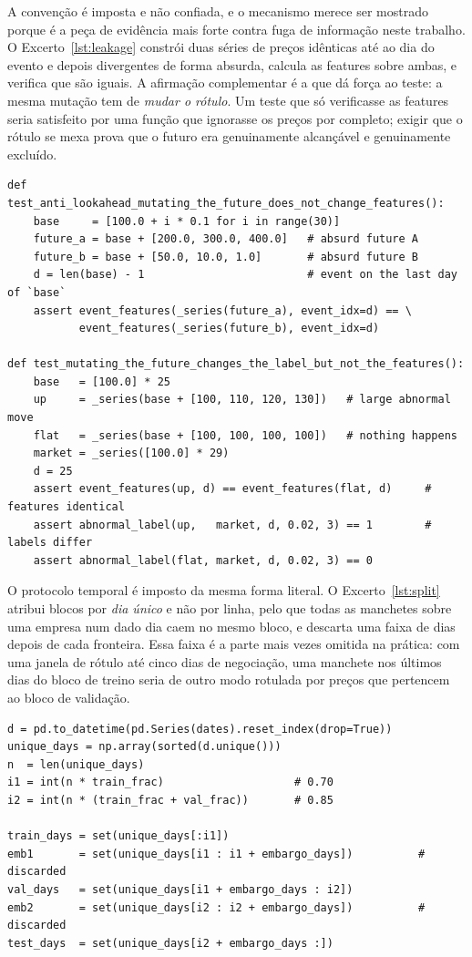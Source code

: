 A convenção é imposta e não confiada, e o mecanismo merece ser mostrado porque é a peça de evidência
mais forte contra fuga de informação neste trabalho. O Excerto~\ref{lst:leakage} constrói duas séries
de preços idênticas até ao dia do evento e depois divergentes de forma absurda, calcula as features
sobre ambas, e verifica que são iguais. A afirmação complementar é a que dá força ao teste: a mesma
mutação tem de \emph{mudar o rótulo}. Um teste que só verificasse as features seria satisfeito por uma
função que ignorasse os preços por completo; exigir que o rótulo se mexa prova que o futuro era
genuinamente alcançável e genuinamente excluído.

\begin{lstlisting}[caption={O teste de não-lookahead. Mutar o futuro tem de deixar cada feature intacta
e tem de mudar o rótulo.}, label={lst:leakage}]
def test_anti_lookahead_mutating_the_future_does_not_change_features():
    base     = [100.0 + i * 0.1 for i in range(30)]
    future_a = base + [200.0, 300.0, 400.0]   # absurd future A
    future_b = base + [50.0, 10.0, 1.0]       # absurd future B
    d = len(base) - 1                         # event on the last day of `base`
    assert event_features(_series(future_a), event_idx=d) == \
           event_features(_series(future_b), event_idx=d)

def test_mutating_the_future_changes_the_label_but_not_the_features():
    base   = [100.0] * 25
    up     = _series(base + [100, 110, 120, 130])   # large abnormal move
    flat   = _series(base + [100, 100, 100, 100])   # nothing happens
    market = _series([100.0] * 29)
    d = 25
    assert event_features(up, d) == event_features(flat, d)     # features identical
    assert abnormal_label(up,   market, d, 0.02, 3) == 1        # labels differ
    assert abnormal_label(flat, market, d, 0.02, 3) == 0
\end{lstlisting}

O protocolo temporal é imposto da mesma forma literal. O Excerto~\ref{lst:split} atribui blocos por
\emph{dia único} e não por linha, pelo que todas as manchetes sobre uma empresa num dado dia caem no
mesmo bloco, e descarta uma faixa de dias depois de cada fronteira. Essa faixa é a parte mais vezes
omitida na prática: com uma janela de rótulo até cinco dias de negociação, uma manchete nos últimos
dias do bloco de treino seria de outro modo rotulada por preços que pertencem ao bloco de validação.

\begin{lstlisting}[caption={Divisão temporal por dia único, com faixa de embargo depois de cada
fronteira.}, label={lst:split}]
d = pd.to_datetime(pd.Series(dates).reset_index(drop=True))
unique_days = np.array(sorted(d.unique()))
n  = len(unique_days)
i1 = int(n * train_frac)                    # 0.70
i2 = int(n * (train_frac + val_frac))       # 0.85

train_days = set(unique_days[:i1])
emb1       = set(unique_days[i1 : i1 + embargo_days])          # discarded
val_days   = set(unique_days[i1 + embargo_days : i2])
emb2       = set(unique_days[i2 : i2 + embargo_days])          # discarded
test_days  = set(unique_days[i2 + embargo_days :])
\end{lstlisting}

